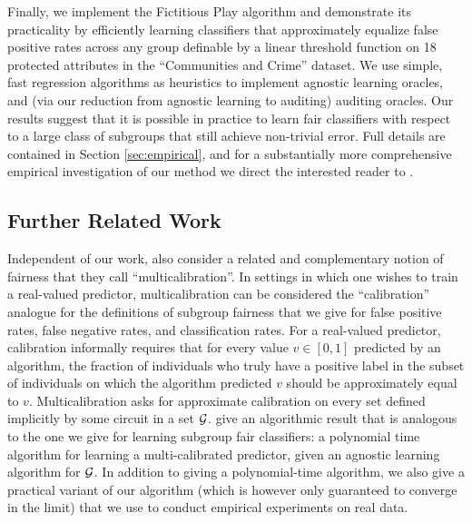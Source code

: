 Finally, we implement the Fictitious Play algorithm and demonstrate its practicality by efficiently learning classifiers that approximately equalize false positive rates across any group definable by a linear threshold function on 18 protected attributes in the ``Communities and Crime'' dataset. We use simple, fast regression algorithms as heuristics to implement agnostic learning oracles, and (via our reduction from agnostic learning to auditing) auditing oracles. Our results suggest that it is possible in practice to learn fair classifiers with respect to a large class of subgroups that still achieve non-trivial error. Full details are contained in Section \ref{sec:empirical}, and for a substantially more comprehensive empirical investigation of our method we direct the interested reader to \cite{experimental}.


\subsection{Further Related Work}

Independent of our work, \cite{calibration} also consider a related and complementary notion of fairness that they call ``multicalibration''. In settings in which one wishes to train a real-valued predictor, multicalibration can be considered the ``calibration'' analogue for the definitions of subgroup fairness that we give for false positive rates, false negative rates, and classification rates. For a real-valued predictor, calibration informally requires that for every value $v \in [0,1]$ predicted by an algorithm, the fraction of individuals who truly have a positive label in the subset of individuals on which the algorithm predicted $v$ should be approximately equal to $v$. Multicalibration asks for approximate calibration on every set defined implicitly by some circuit in a set $\mathcal{G}$. \cite{calibration} give an algorithmic result that is analogous to the one we give for learning subgroup fair classifiers: a polynomial time algorithm for learning a multi-calibrated predictor, given an agnostic learning algorithm for $\mathcal{G}$. In addition to giving a polynomial-time algorithm, we also give a practical variant of our algorithm (which is however only guaranteed to converge in the limit) that we use to conduct empirical experiments on real data.

